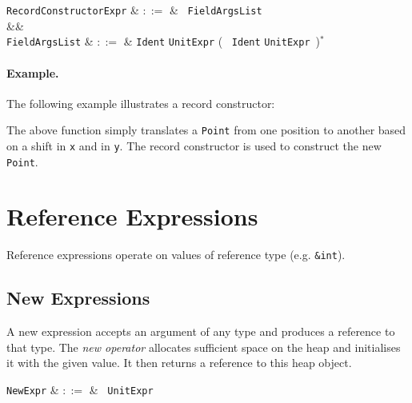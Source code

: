 \begin{syntax}
  \verb+RecordConstructorExpr+ & $::=$ & \token{\{}\ \verb+FieldArgsList+\ \token{\}}\\
&&\\
  \verb+FieldArgsList+ & $::=$ & \verb+Ident+ \token{:} \verb+UnitExpr+ \big(\ \token{,} \verb+Ident+ \token{:} \verb+UnitExpr+\ \big)$^*$\\
\end{syntax}

\paragraph{Example.} The following example illustrates a record constructor:



The above function simply translates a \lstinline{Point} from one position to another based on a shift in \lstinline{x} and in \lstinline{y}.  The record constructor is used to construct the new \lstinline{Point}.

\section{Reference Expressions}

Reference expressions operate on values of reference type (e.g. \lstinline{&int}).


\subsection{New Expressions}
\label{c_expr_new}

A new expression accepts an argument of any type and produces a reference to that type.  The {\em new operator} allocates sufficient space on the heap and initialises it with the given value.  It then returns a reference to this heap object.

\begin{syntax}
\verb+NewExpr+ & $::=$ & \ \verb+UnitExpr+\\
\end{syntax}

